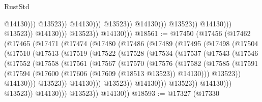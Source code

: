 \begin{lexlean}{RustStd}
\begin{coremodule}
                                                            @14130)))
                                                      @13523))
                                                  @14130)))
                                            @13523))
                                        @14130)))
                                  @13523))
                              @14130)))
                        @13523))
                    @14130)))
              @13523))
          @14130)))
@18561 := @17450
    (@17456
      (@17462
        (@17465
          (@17471
            (@17474
              (@17480
                (@17486
                  (@17489
                    (@17495
                      (@17498
                        (@17504
                          (@17510
                            (@17513
                              (@17519
                                (@17522
                                  (@17528
                                    (@17534
                                      (@17537
                                        (@17543
                                          (@17546
                                            (@17552
                                              (@17558
                                                (@17561
                                                  (@17567
                                                    (@17570
                                                      (@17576
                                                        (@17582
                                                          (@17585
                                                            (@17591
                                                              (@17594
                                                                (@17600
                                                                  (@17606
                                                                    (@17609 (@18513 @13523))
                                                                    @14130)))
                                                              @13523))
                                                          @14130)))
                                                    @13523))
                                                @14130)))
                                          @13523))
                                      @14130)))
                                @13523))
                            @14130)))
                      @13523))
                  @14130)))
            @13523))
        @14130))
@18593 := @17327
    (@17330

\end{coremodule}
\end{lexlean}
